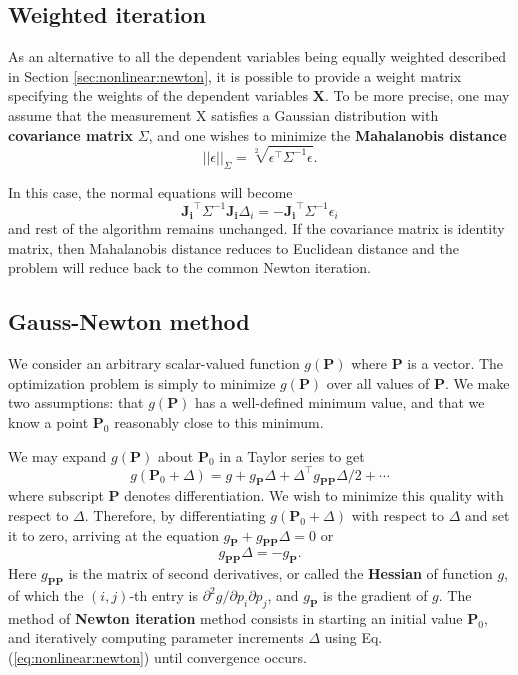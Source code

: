 \documentclass[12pt]{article}
\numberwithin{equation}{section}
\begin{document}
\subsection{Weighted iteration}

As an alternative to all the dependent variables being equally
weighted described in Section \ref{sec:nonlinear:newton}, it is possible to provide a weight matrix specifying the weights of the dependent variables $\mathbf{X}$. To be more precise, one may assume that the measurement X satisfies a Gaussian distribution with \textbf{covariance matrix} $\Sigma$, and one wishes to minimize the \textbf{Mahalanobis distance}
\begin{equation}
||\epsilon||_{\Sigma} = \sqrt[2]{\epsilon^\top \Sigma^{-1} \epsilon}.
\end{equation}

In this case, the normal equations will become
\begin{equation}
\mathbf{J_i}^\top \Sigma ^{-1} \mathbf{J_i}\Delta_i = -\mathbf{J_i}^\top \Sigma ^{-1}  \epsilon_i
\end{equation}
and rest of the algorithm remains unchanged.
%
If the covariance matrix is identity matrix, then Mahalanobis distance reduces to Euclidean distance and the problem will reduce back to the common Newton iteration.

\subsection{Gauss-Newton method}

We consider an arbitrary scalar-valued function $g(\mathbf{P})$ where $\mathbf{P}$ is a vector. The optimization problem is simply to minimize $g(\mathbf{P})$ over all values of $\mathbf{P}$. We make two assumptions: that $g(\mathbf{P})$ has a well-defined minimum value, and that we know a point $\mathbf{P}_0$ reasonably close to this minimum.

We may expand $g(\mathbf{P})$ about $\mathbf{P}_0$ in a Taylor series to get
\begin{equation*}
g(\mathbf{P}_0 + \Delta) = g + g_{\mathbf{P}}\Delta + \Delta^\top g_{\mathbf{PP}}\Delta / 2 + \cdots
\end{equation*}
where subscript $\mathbf{P}$ denotes differentiation. We wish to minimize this quality with respect to $\Delta$. Therefore, by differentiating $g(\mathbf{P}_0 + \Delta)$ with respect to $\Delta$ and set it to zero, arriving at the equation $g_{\mathbf{P}} + g_{\mathbf{PP}}\Delta = 0$ or
\begin{equation}
g_{\mathbf{PP}}\Delta = -g_{\mathbf{P}}.
\label{eq:nonlinear:newton}
\end{equation}
Here $g_{\mathbf{PP}}$ is the matrix of second derivatives, or called the \textbf{Hessian} of function $g$, of which the $(i,j)$-th entry is $\partial^2 g / \partial p_i \partial p_j$, and $g_{\mathbf{P}}$ is the gradient of $g$. The method of \textbf{Newton iteration} method consists in starting an initial value $\mathbf{P}_0$, and iteratively computing parameter increments $\Delta$ using Eq. (\ref{eq:nonlinear:newton}) until convergence occurs.
\end{document}
